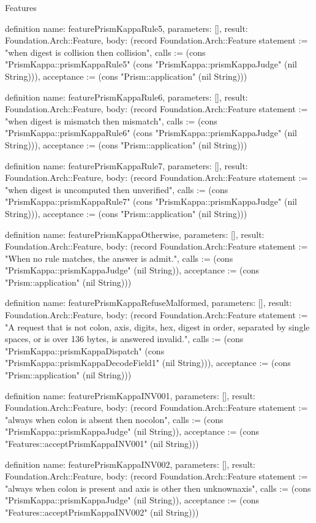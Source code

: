 \begin{lexlean}{Features}
\begin{semanticmodule}
definition{
  name: featurePrismKappaRule5,
  parameters: [],
  result: Foundation.Arch::Feature,
  body: (record Foundation.Arch::Feature {statement := "when digest is collision then collision", calls := (cons "PrismKappa::prismKappaRule5" (cons "PrismKappa::prismKappaJudge" (nil String))), acceptance := (cons "Prism::application" (nil String))})
}

definition{
  name: featurePrismKappaRule6,
  parameters: [],
  result: Foundation.Arch::Feature,
  body: (record Foundation.Arch::Feature {statement := "when digest is mismatch then mismatch", calls := (cons "PrismKappa::prismKappaRule6" (cons "PrismKappa::prismKappaJudge" (nil String))), acceptance := (cons "Prism::application" (nil String))})
}

definition{
  name: featurePrismKappaRule7,
  parameters: [],
  result: Foundation.Arch::Feature,
  body: (record Foundation.Arch::Feature {statement := "when digest is uncomputed then unverified", calls := (cons "PrismKappa::prismKappaRule7" (cons "PrismKappa::prismKappaJudge" (nil String))), acceptance := (cons "Prism::application" (nil String))})
}

definition{
  name: featurePrismKappaOtherwise,
  parameters: [],
  result: Foundation.Arch::Feature,
  body: (record Foundation.Arch::Feature {statement := "When no rule matches, the answer is admit.", calls := (cons "PrismKappa::prismKappaJudge" (nil String)), acceptance := (cons "Prism::application" (nil String))})
}

definition{
  name: featurePrismKappaRefuseMalformed,
  parameters: [],
  result: Foundation.Arch::Feature,
  body: (record Foundation.Arch::Feature {statement := "A request that is not colon, axis, digits, hex, digest in order, separated by single spaces, or is over 136 bytes, is answered invalid.", calls := (cons "PrismKappa::prismKappaDispatch" (cons "PrismKappa::prismKappaDecodeField1" (nil String))), acceptance := (cons "Prism::application" (nil String))})
}

definition{
  name: featurePrismKappaINV001,
  parameters: [],
  result: Foundation.Arch::Feature,
  body: (record Foundation.Arch::Feature {statement := "always when colon is absent then nocolon", calls := (cons "PrismKappa::prismKappaJudge" (nil String)), acceptance := (cons "Features::acceptPrismKappaINV001" (nil String))})
}

definition{
  name: featurePrismKappaINV002,
  parameters: [],
  result: Foundation.Arch::Feature,
  body: (record Foundation.Arch::Feature {statement := "always when colon is present and axis is other then unknownaxis", calls := (cons "PrismKappa::prismKappaJudge" (nil String)), acceptance := (cons "Features::acceptPrismKappaINV002" (nil String))})
}


\end{semanticmodule}
\end{lexlean}
